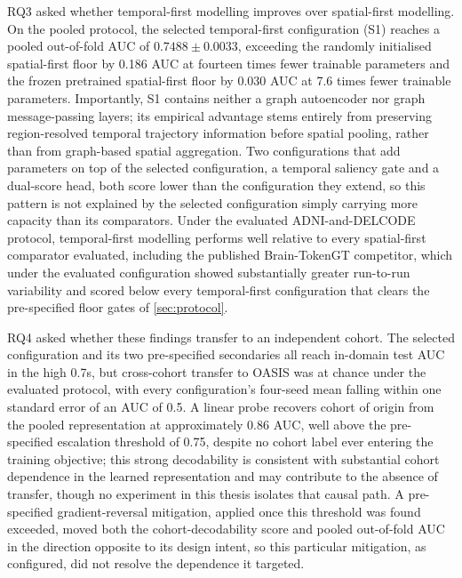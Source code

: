 RQ3 asked whether temporal-first modelling improves over spatial-first modelling. On the
pooled protocol, the selected temporal-first configuration (S1) reaches a pooled out-of-fold
\ac{AUC} of $0.7488 \pm 0.0033$, exceeding the randomly initialised spatial-first floor by
0.186 \ac{AUC} at fourteen times fewer trainable parameters and the frozen pretrained
spatial-first floor by 0.030 \ac{AUC} at 7.6 times fewer trainable parameters. Importantly,
S1 contains neither a graph autoencoder nor graph message-passing layers; its empirical
advantage stems entirely from preserving region-resolved temporal trajectory information before
spatial pooling, rather than from graph-based spatial aggregation. Two configurations that
add parameters on top of the selected configuration, a temporal saliency gate and a
dual-score head, both score lower than the configuration they extend, so this pattern is not
explained by the selected configuration simply carrying more capacity than its comparators.
Under the evaluated \ac{ADNI}-and-\ac{DELCODE} protocol, temporal-first modelling performs well
relative to every spatial-first comparator evaluated, including the published Brain-TokenGT
competitor, which under the evaluated configuration showed substantially greater run-to-run
variability and scored below every temporal-first configuration that clears the pre-specified floor
gates of \autoref{sec:protocol}.

RQ4 asked whether these findings transfer to an independent cohort. The selected
configuration and its two pre-specified secondaries all reach in-domain test \ac{AUC} in
the high 0.7s, but cross-cohort transfer to \ac{OASIS} was at chance under the evaluated
protocol, with every configuration's four-seed mean falling within one standard error of an
\ac{AUC} of 0.5. A linear probe recovers cohort of origin from the pooled representation at
approximately 0.86 \ac{AUC}, well above the pre-specified escalation threshold of 0.75,
despite no cohort label ever entering the training objective; this strong decodability is
consistent with substantial cohort dependence in the learned representation and may
contribute to the absence of transfer, though no experiment in this thesis isolates that
causal path. A pre-specified gradient-reversal mitigation, applied once this threshold was
found exceeded, moved both the cohort-decodability score and pooled out-of-fold \ac{AUC} in
the direction opposite to its design intent, so this particular mitigation, as configured,
did not resolve the dependence it targeted.


